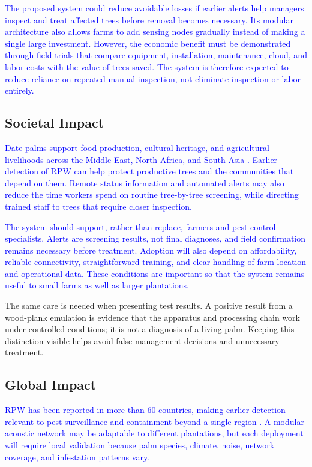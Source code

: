 \documentclass[12pt,a4paper,oneside]{memoir}
\newcommand{\earlierrevision}[1]{\textcolor{blue}{#1}}
\newcommand{\newrevision}[1]{\textcolor{green!45!black}{#1}}
\begin{document}
\earlierrevision{The proposed system could reduce avoidable losses if earlier alerts help managers inspect and treat affected trees before removal becomes necessary. Its modular architecture also allows farms to add sensing nodes gradually instead of making a single large investment. However, the economic benefit must be demonstrated through field trials that compare equipment, installation, maintenance, cloud, and labor costs with the value of trees saved. The system is therefore expected to reduce reliance on repeated manual inspection, not eliminate inspection or labor entirely.}
 
\subsection{Societal Impact}
 
\earlierrevision{Date palms support food production, cultural heritage, and agricultural livelihoods across the Middle East, North Africa, and South Asia \cite{saleem2022}. Earlier detection of RPW can help protect productive trees and the communities that depend on them. Remote status information and automated alerts may also reduce the time workers spend on routine tree-by-tree screening, while directing trained staff to trees that require closer inspection.}

\earlierrevision{The system should support, rather than replace, farmers and pest-control specialists. Alerts are screening results, not final diagnoses, and field confirmation remains necessary before treatment. Adoption will also depend on affordability, reliable connectivity, straightforward training, and clear handling of farm location and operational data. These conditions are important so that the system remains useful to small farms as well as larger plantations.}

\newrevision{The same care is needed when presenting test results. A positive result from a wood-plank emulation is evidence that the apparatus and processing chain work under controlled conditions; it is not a diagnosis of a living palm. Keeping this distinction visible helps avoid false management decisions and unnecessary treatment.}
 
\subsection{Global Impact}
 
\earlierrevision{RPW has been reported in more than 60 countries, making earlier detection relevant to pest surveillance and containment beyond a single region \cite{ashry2022cnn,saleem2022}. A modular acoustic network may be adaptable to different plantations, but each deployment will require local validation because palm species, climate, noise, network coverage, and infestation patterns vary.}
\end{document}
